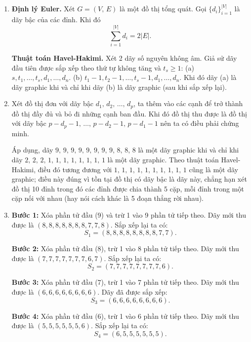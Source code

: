 \documentclass[a4paper, 11pt]{article}
\theoremstyle{definition}
\begin{document}
	\begin{enumerate}[label=(\alph*)]
		\item \textbf{Định lý Euler. }Xét $G = (V,\,E)$ là một đồ thị tổng quát. Gọi $\{d_i\}_{i=1}^{|V|}$ là dãy bậc của các đỉnh. Khi đó 
		\begin{equation*}
			\sum_{i=1}^{|V|} d_i = 2|E|.
		\end{equation*}

		\textbf{Thuật toán Havel-Hakimi. }Xét 2 dãy số nguyên không âm. Giả sử dãy đầu tiên được sắp xếp theo thứ tự không tăng và $t_s \geq 1$: (a) $s,t_1,\ldots,t_s,d_1,\ldots,d_n$. (b) $t_1 - 1,t_2 - 1,\ldots,t_s - 1,d_1,\ldots,d_n$. Khi đó dãy (a) là dãy graphic khi và chỉ khi dãy (b) là dãy graphic (sau khi sắp xếp lại).

		\item Xét đồ thị đơn với dãy bậc $d_1,\,d_2,\,\ldots,\,d_p$, ta thêm vào các cạnh để trở thành đồ thị đầy đủ và bỏ đi những cạnh ban đầu. Khi đó đồ thị thu được là đồ thị với dãy bậc $p - d_p - 1,\,\ldots,\,p-d_2-1,\,p-d_1-1$ nên ta có điều phải chứng minh.
		
		Áp dụng, dãy $9,\,9,\,9,\,9,\,9,\,9,\,9,\,9,\,8,\,8,\,8$ là một dãy graphic khi và chỉ khi dãy $2,\,2,\,2,\,1,\,1,\,1,\,1,\,1,\,1,\,1,\,1$ là một dãy graphic. Theo thuật toán Havel-Hakimi, điều đó tương đương với $1,\,1,\,1,\,1,\,1,\,1,\,1,\,1,\,1,\,1$ cũng là một dãy graphic; điều này đúng vì tồn tại đồ thị có dãy bậc là dãy này, chẳng hạn xét đồ thị 10 đỉnh trong đó các đỉnh được chia thành 5 cặp, mỗi đỉnh trong một cặp nối với nhau (hay nói cách khác là 5 đoạn thẳng rời nhau).

		\item \textbf{Bước 1:} Xóa phần tử đầu (9) và trừ 1 vào 9 phần tử tiếp theo. Dãy mới thu được là $(8, 8, 8, 8, 8, 8, 8, 7, 7, 8)$. Sắp xếp lại ta có:
			$$S_1 = (8, 8, 8, 8, 8, 8, 8, 8, 7, 7).$$

			\textbf{Bước 2:} Xóa phần tử đầu (8), trừ 1 vào 8 phần tử tiếp theo. Dãy mới thu được là $(7, 7, 7, 7, 7, 7, 7, 6, 7)$. Sắp xếp lại ta có:
			$$S_2 = (7, 7, 7, 7, 7, 7, 7, 7, 6).$$

			\textbf{Bước 3:} Xóa phần tử đầu (7), trừ 1 vào 7 phần tử tiếp theo. Dãy mới thu được là $(6, 6, 6, 6, 6, 6, 6, 6)$. Dãy đã được sắp xếp:
			$$S_3 = (6, 6, 6, 6, 6, 6, 6, 6).$$

			\textbf{Bước 4:} Xóa phần tử đầu (6), trừ 1 vào 6 phần tử tiếp theo. Dãy mới thu được là $(5, 5, 5, 5, 5, 5, 6)$. Sắp xếp lại ta có:
			$$S_4 = (6, 5, 5, 5, 5, 5, 5).$$


\end{enumerate}
\end{document}
